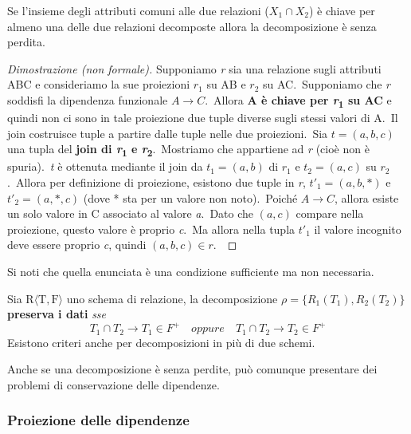 \begin{theorem}
	Se l'insieme degli attributi comuni alle due relazioni ($X_1 \cap X_2$) è chiave per almeno una delle due relazioni decomposte allora la decomposizione è senza perdita.\
\end{theorem}

\begin{proof}[Dimostrazione (non formale)]

	Supponiamo \textit{r} sia una relazione sugli attributi ABC e consideriamo la sue proiezioni $r_1$ su AB e $r_2$ su AC.\
	Supponiamo che \textit{r} soddisfi la dipendenza funzionale $A \rightarrow C$.\
	Allora \textbf{A è chiave per \textit{r}\textsubscript{1} su AC} e quindi non ci sono in tale proiezione due tuple diverse sugli stessi valori di A.\
	Il join costruisce tuple a partire dalle tuple nelle due proiezioni.\
	Sia $t = (a,b,c)$ una tupla del \textbf{join di \textit{r}\textsubscript{1} e \textit{r}\textsubscript{2}}.\
	Mostriamo che appartiene ad \textit{r} (cioè non è spuria).\
	\textit{t} è ottenuta mediante il join da $t_1 = (a,b)$ di $r_1$ e $t_2= (a,c)$ su $r_2$.\
	Allora per definizione di proiezione, esistono due tuple in \textit{r}, $t'_1 = (a,b,*)$ e $t'_2= (a,*,c)$ (dove * sta per un valore non noto).\
	Poiché $A \rightarrow C$, allora esiste un solo valore in C associato al valore \textit{a}.\ Dato che $(a,c)$ compare nella proiezione, questo valore è proprio \textit{c}.\
	Ma allora nella tupla $t'_1$ il valore incognito deve essere proprio \textit{c}, quindi $(a,b,c) \in r$.\
\end{proof}

\noindent Si noti che quella enunciata è una condizione sufficiente ma non necessaria.\

\begin{theorem}
	Sia $\mathrm{R\langle T,F \rangle}$ uno schema di relazione, la decomposizione $\rho = \{R_1(T_1), R_2(T_2)\}$ \textbf{preserva i dati} \textit{sse}
	\[
		T_1 \cap T_2 \rightarrow T_1 \in F^+ \quad oppure \quad  T_1 \cap T_2 \rightarrow T_2 \in F^+
	\]
	Esistono criteri anche per decomposizioni in più di due schemi.
\end{theorem}

\noindent Anche se una decomposizione è senza perdite, può comunque presentare dei problemi di conservazione delle dipendenze.\

\subsubsection{Proiezione delle dipendenze}

